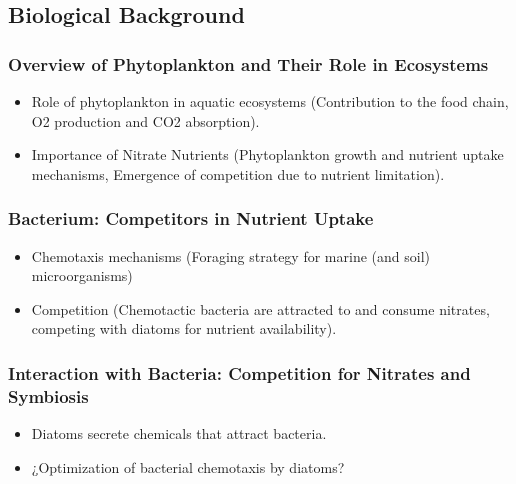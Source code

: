 \subsection{Biological Background}

\subsubsection*{Overview of Phytoplankton and Their Role in Ecosystems}

\begin{itemize}
    \item Role of phytoplankton in aquatic ecosystems (Contribution to the food chain, O2 production and CO2 absorption).
    \item Importance of Nitrate Nutrients (Phytoplankton growth and nutrient uptake mechanisms, Emergence of competition due to nutrient limitation).
\end{itemize}

\subsubsection*{Bacterium: Competitors in Nutrient Uptake}

\begin{itemize}
    \item Chemotaxis mechanisms (Foraging strategy for marine (and soil) microorganisms)
    \item Competition (Chemotactic bacteria are attracted to and consume nitrates, competing with diatoms for nutrient availability).
\end{itemize}

\subsubsection*{Interaction with Bacteria: Competition for Nitrates and Symbiosis}

\begin{itemize}
    \item Diatoms secrete chemicals that attract bacteria.
    \item \color{red} ¿Optimization of bacterial chemotaxis by diatoms?
\end{itemize}